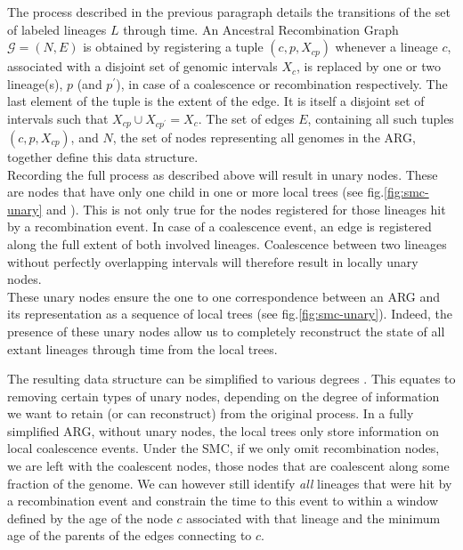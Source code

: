 \documentclass{article}
\begin{document}
The process described in the previous paragraph details the transitions of the 
set of labeled lineages $L$ through time. An Ancestral Recombination Graph 
$\mathcal{G} = (N, E)$ is obtained by registering a tuple $(c, p, X_{cp})$ whenever a 
lineage $c$, associated with a disjoint set of genomic intervals $X_c$, is 
replaced by one or two lineage(s), $p$ (and $p^{\prime}$), 
in case of a coalescence or recombination respectively.
The last element of the tuple is the extent of the edge. It is itself a  
disjoint set of intervals such that $X_{cp} \cup X_{cp^{\prime}} = X_c$. 
The set of edges $E$, containing all such tuples $(c, p, X_{cp})$, 
and $N$, the set of nodes representing all genomes in the ARG, together
define this data structure.\\

Recording the full process as described above will result in unary nodes.
These are nodes that have only one child in one or more local trees 
(see fig.\ref{fig:smc-unary} and \citet{Wong-2023}). This is not only true 
for the nodes registered for those lineages hit by a recombination event. 
In case of a coalescence event, an edge is registered along the full 
extent of both involved lineages. 
Coalescence between two lineages without perfectly 
overlapping intervals will therefore result in locally unary nodes.\\

These unary nodes ensure the one to one correspondence between an ARG and its 
representation as a sequence of local trees (see fig.\ref{fig:smc-unary}). 
Indeed, the presence of these unary nodes allow us to completely reconstruct 
the state of all extant lineages through time from the local trees. 


The resulting data structure can be simplified to various degrees \citep{Wong-2023}. 
This equates to removing certain types of unary nodes, 
depending on the degree of information 
we want to retain (or can reconstruct) from the original process. 
In a fully simplified ARG, without unary nodes, 
the local trees only store information on local coalescence events.
Under the SMC, if we only omit recombination nodes, %
we are left with the coalescent nodes, those nodes that are coalescent 
along some fraction of the genome. We can however still identify \emph{all} 
lineages that were hit by a recombination event and constrain the time to 
this event to within a window defined by the age of the node $c$ associated with that 
lineage and the minimum age of the parents of the edges connecting to $c$.
\end{document}
